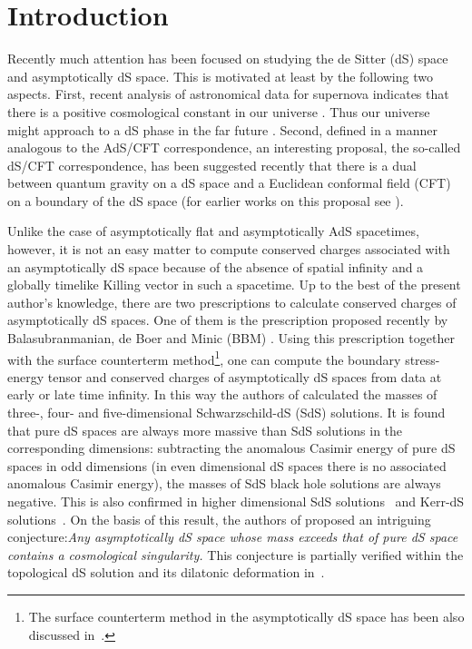 \documentclass[a4paper,12pt]{article}
\newcommand{\sect}[1]{\setcounter{equation}{0}\section{#1}}
\begin{document}
\sect{Introduction}
Recently much attention has been focused on studying the de Sitter (dS) space and 
asymptotically dS space. This is motivated at least by the following two aspects.
First, recent analysis of astronomical data for supernova indicates that there is a
positive cosmological constant in our universe \cite{Per,CDS,Gar}. Thus our universe
might approach to a dS phase in the far future \cite{HKS,FKMP}. Second, defined in 
a manner analogous to the AdS/CFT correspondence, an interesting proposal, the so-called
dS/CFT correspondence, has been 
suggested recently that there is a dual between quantum gravity on a dS space and 
a Euclidean conformal field (CFT) on a boundary of the dS space \cite{Stron1}
(for earlier works on this proposal see \cite{Hull,Bala,Witten1,Mazu}).


Unlike the case of asymptotically flat and asymptotically AdS spacetimes, however,
it is not an easy matter to compute conserved charges associated with an asymptotically 
dS space because of the absence of spatial infinity and a globally timelike Killing 
vector in such a spacetime. Up to the best of the present author's knowledge, there are
two prescriptions to calculate conserved charges of asymptotically dS spaces.  One of them
is the prescription proposed  recently by Balasubranmanian, de Boer 
and Minic (BBM) \cite{BBM}. Using this prescription together with the surface counterterm 
method\footnote{The surface
counterterm method in the asymptotically dS space has been also discussed 
in~\cite{Noji1, Klem1}.}, one can compute the boundary stress-energy tensor and
conserved charges of asymptotically dS spaces from data at early or late time infinity.   
In this way the authors of \cite{BBM} calculated the masses of three-, four- and 
five-dimensional Schwarzschild-dS (SdS) solutions. It is found that pure dS spaces are 
always more massive than SdS solutions in the corresponding dimensions: subtracting the
anomalous Casimir energy of pure dS spaces in odd dimensions (in even dimensional dS spaces
there is no associated  anomalous Casimir energy), the masses of SdS black hole 
solutions are always negative. This is also confirmed in higher dimensional SdS
solutions~\cite{Mann} and Kerr-dS solutions~\cite{Dehg}.  On the basis of this result,
 the authors of \cite{BBM} proposed an intriguing conjecture:{\it Any asymptotically dS space 
whose mass exceeds that of pure dS space contains a cosmological singularity.} This conjecture is
 partially verified within the topological dS solution and its dilatonic 
deformation in~\cite{CMZ}.
\end{document}
